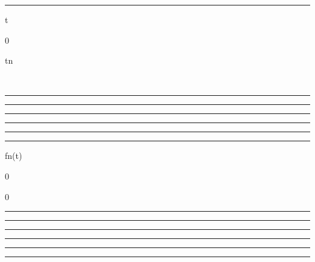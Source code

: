\begin{center}\rule{3in}{0.4pt}\end{center}

t

0

tn

\pi~

\begin{center}\rule{3in}{0.4pt}\end{center}

\begin{center}\rule{3in}{0.4pt}\end{center}

\begin{center}\rule{3in}{0.4pt}\end{center}

\begin{center}\rule{3in}{0.4pt}\end{center}

\begin{center}\rule{3in}{0.4pt}\end{center}

\begin{center}\rule{3in}{0.4pt}\end{center}

fn(t)

0

\nearrow

\mun

\searrow

0

\begin{center}\rule{3in}{0.4pt}\end{center}

\begin{center}\rule{3in}{0.4pt}\end{center}

\begin{center}\rule{3in}{0.4pt}\end{center}

\begin{center}\rule{3in}{0.4pt}\end{center}

\begin{center}\rule{3in}{0.4pt}\end{center}

\begin{center}\rule{3in}{0.4pt}\end{center}

